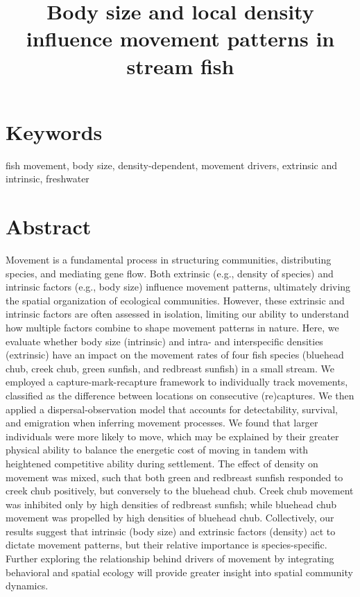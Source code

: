 \documentclass[11pt, class=article, crop=false]{standalone}
\title{Body size and local density influence movement patterns in stream fish}
\date{} %
\author{} %
\begin{document}
\maketitle


\section*{Keywords}

fish movement, body size, density-dependent, movement drivers, extrinsic and intrinsic, freshwater

\section{Abstract}

 Movement is a fundamental process in structuring communities, distributing species, and mediating gene flow. Both extrinsic (e.g., density of species) and intrinsic factors (e.g., body size) influence movement patterns, ultimately driving the spatial organization of ecological communities. However, these extrinsic and intrinsic factors are often assessed in isolation, limiting our ability to understand how multiple factors combine to shape movement patterns in nature. Here, we evaluate whether body size (intrinsic) and intra- and interspecific densities (extrinsic) have an impact on the movement rates of four fish species (bluehead chub, creek chub, green sunfish, and redbreast sunfish) in a small stream. We employed a capture-mark-recapture framework to individually track movements, classified as the difference between locations on consecutive (re)captures. We then applied a dispersal-observation model that accounts for detectability, survival, and emigration when inferring movement processes. We found that larger individuals were more likely to move, which may be explained by their greater physical ability to balance the energetic cost of moving in tandem with heightened competitive ability during settlement. The effect of density on movement was mixed, such that both green and redbreast sunfish responded to creek chub positively, but conversely to the bluehead chub. Creek chub movement was inhibited only by high densities of redbreast sunfish; while bluehead chub movement was propelled by high densities of bluehead chub. Collectively, our results suggest that intrinsic (body size) and extrinsic factors (density) act to dictate movement patterns, but their relative importance is species-specific. Further exploring the relationship behind drivers of movement by integrating behavioral and spatial ecology will provide greater insight into spatial community dynamics.
\end{document}
